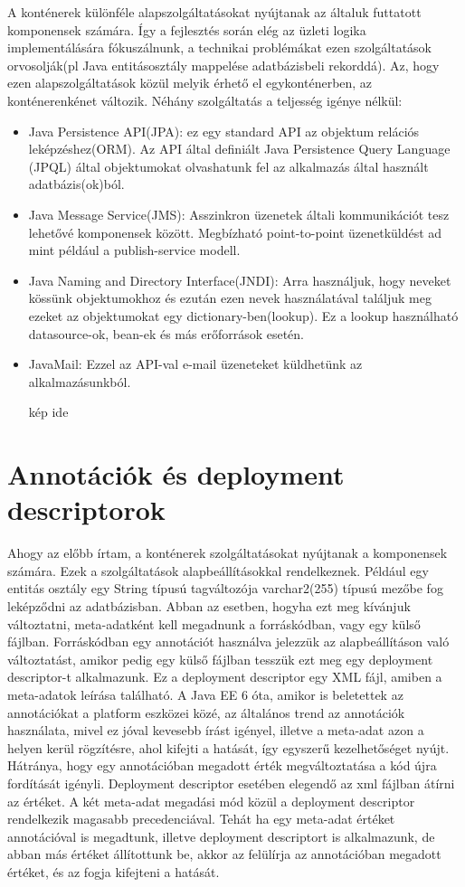\documentclass[centeredchapter]{thesis-ekf}
\theoremstyle{definition}
\theoremstyle{remark}
\begin{document}
A konténerek különféle alapszolgáltatásokat nyújtanak az általuk futtatott komponensek számára.
Így a fejlesztés során elég az üzleti logika implementálására fókuszálnunk, a technikai problémákat ezen szolgáltatások orvosolják(pl Java entitásosztály mappelése adatbázisbeli rekorddá).
Az, hogy ezen alapszolgáltatások közül melyik érhető el egykonténerben, az konténerenkénet változik.
Néhány szolgáltatás a teljesség igénye nélkül:
\begin{itemize}
	\item Java Persistence API(JPA): ez egy standard API az objektum relációs leképzéshez(ORM). Az API által definiált Java Persistence Query Language (JPQL) által objektumokat olvashatunk fel az alkalmazás által használt adatbázis(ok)ból.
	\item Java Message Service(JMS): Asszinkron üzenetek általi kommunikációt tesz lehetővé komponensek között. Megbízható point-to-point üzenetküldést ad mint például a publish-service modell.
	\item Java Naming and Directory Interface(JNDI): Arra használjuk, hogy neveket kössünk objektumokhoz és ezután ezen nevek használatával találjuk meg ezeket az objektumokat egy dictionary-ben(lookup). Ez a lookup használható datasource-ok, bean-ek és más erőforrások esetén.
	\item JavaMail: Ezzel az API-val e-mail üzeneteket küldhetünk az alkalmazásunkból.
	
	kép ide
\end{itemize}

\section{Annotációk és deployment descriptorok}

Ahogy az előbb írtam, a konténerek szolgáltatásokat nyújtanak a komponensek számára. Ezek a szolgáltatások alapbeállításokkal rendelkeznek. Például egy entitás osztály egy String típusú tagváltozója varchar2(255) típusú mezőbe fog leképződni az adatbázisban. Abban az esetben, hogyha ezt meg kívánjuk változtatni, meta-adatként kell megadnunk a forráskódban, vagy egy külső fájlban. Forráskódban egy annotációt használva jelezzük az alapbeállításon való változtatást, amikor pedig egy külső fájlban tesszük ezt meg egy deployment descriptor-t alkalmazunk. Ez a deployment descriptor egy XML fájl, amiben a meta-adatok leírása található. A Java EE 6 óta, amikor is beletettek az annotációkat a platform eszközei közé, az általános trend az annotációk használata, mivel ez jóval kevesebb írást igényel, illetve a meta-adat azon a helyen kerül rögzítésre, ahol kifejti a hatását, így egyszerű kezelhetőséget nyújt. Hátránya, hogy egy annotációban megadott érték megváltoztatása a kód újra fordítását igényli. Deployment descriptor esetében elegendő az xml fájlban átírni az értéket.
A két meta-adat megadási mód közül a deployment descriptor rendelkezik magasabb precedenciával. Tehát ha egy meta-adat értéket annotációval is megadtunk, illetve deployment descriptort is alkalmazunk, de abban más értéket állítottunk be, akkor az felülírja az annotációban megadott értéket, és az fogja kifejteni a hatását.
\end{document}
